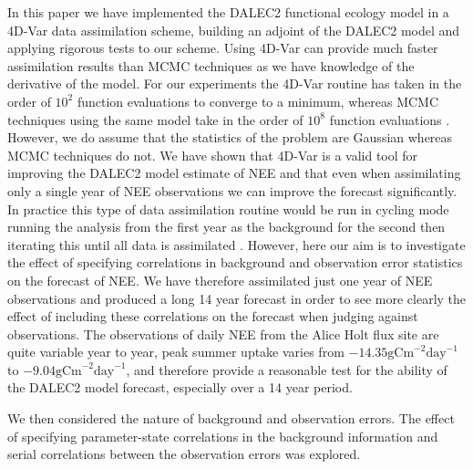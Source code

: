 \documentclass[review]{elsarticle}
\begin{document}
In this paper we have implemented the DALEC2 functional ecology model in a 4D-Var data assimilation scheme, building an adjoint of the DALEC2 model and applying rigorous tests to our scheme. Using 4D-Var can provide much faster assimilation results than MCMC techniques as we have knowledge of the derivative of the model. For our experiments the 4D-Var routine has taken in the order of $10^{2}$ function evaluations to converge to a minimum, whereas MCMC techniques using the same model take in the order of $10^{8}$ function evaluations \citep{Bloom2015}. However, we do assume that the statistics of the problem are Gaussian whereas MCMC techniques do not. We have shown that 4D-Var is a valid tool for improving the DALEC2 model estimate of NEE and that even when assimilating only a single year of NEE observations we can improve the forecast significantly. In practice this type of data assimilation routine would be run in cycling mode running the analysis from the first year as the background for the second then iterating this until all data is assimilated \citep{moodycycled4dvar}. However, here our aim is to investigate the effect of specifying correlations in background and observation error statistics on the forecast of NEE. We have therefore assimilated just one year of NEE observations and produced a long 14 year forecast in order to see more clearly the effect of including these correlations on the forecast when judging against observations. The observations of daily NEE from the Alice Holt flux site are quite variable year to year, peak summer uptake varies from $-14.35\text{gCm}^{-2}\text{day}^{-1}$ to $-9.04\text{gCm}^{-2}\text{day}^{-1}$, and therefore provide a reasonable test for the ability of the DALEC2 model forecast, especially over a 14 year period.  

We then considered the nature of background and observation errors. The effect of specifying parameter-state correlations in the background information and serial correlations between the observation errors was explored.
\end{document}
